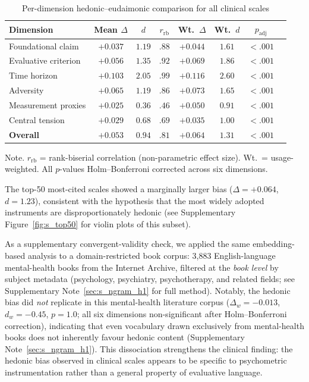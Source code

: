 \documentclass[12pt,a4paper]{article}
\newcommand{\floatnote}[1]{\par\vspace{4pt}\begin{minipage}{\linewidth}\small\textnormal{Note. #1}\end{minipage}}
\begin{document}
\begin{table}[H]
\caption{Per-dimension hedonic--eudaimonic comparison for all clinical scales}
\label{tab:h1_dims}
\small
\begin{tabular}{lccccccc}
\toprule
\textbf{Dimension} & \textbf{Mean $\Delta$} & \textbf{$d$} & \textbf{$r_{\text{rb}}$} & \textbf{Wt.\ $\Delta$} & \textbf{Wt.\ $d$} & \textbf{$p_{\text{adj}}$} \\
\midrule
Foundational claim        & $+0.037$ & $1.19$ & $.88$ & $+0.044$ & $1.61$ & $< .001$ \\
Evaluative criterion      & $+0.056$ & $1.35$ & $.92$ & $+0.069$ & $1.86$ & $< .001$ \\
Time horizon              & $+0.103$ & $2.05$ & $.99$ & $+0.116$ & $2.60$ & $< .001$ \\
Adversity                 & $+0.065$ & $1.19$ & $.86$ & $+0.073$ & $1.65$ & $< .001$ \\
Measurement proxies       & $+0.025$ & $0.36$ & $.46$ & $+0.050$ & $0.91$ & $< .001$ \\
Central tension           & $+0.029$ & $0.68$ & $.69$ & $+0.035$ & $1.00$ & $< .001$ \\
\midrule
\textbf{Overall}       & $\boldsymbol{+0.053}$ & $\boldsymbol{0.94}$ & $\boldsymbol{.81}$ & $\boldsymbol{+0.064}$ & $\boldsymbol{1.31}$ & $\boldsymbol{< .001}$ \\
\bottomrule
\end{tabular}
\floatnote{$r_{\text{rb}}$ = rank-biserial correlation (non-parametric effect size). Wt.\ = usage-weighted. All $p$-values Holm--Bonferroni corrected across six dimensions.}
\end{table}

The top-50 most-cited scales showed a marginally larger bias ($\Delta = +0.064$, $d = 1.23$), consistent with the hypothesis that the most widely adopted instruments are disproportionately hedonic (see Supplementary Figure~\ref{fig:s_top50} for violin plots of this subset).

As a supplementary convergent-validity check, we applied the same embedding-based analysis to a domain-restricted book corpus: 3{,}883 English-language mental-health books from the Internet Archive, filtered at the \textit{book level} by subject metadata (psychology, psychiatry, psychotherapy, and related fields; see Supplementary Note~\ref{sec:s_ngram_h1} for full method).
Notably, the hedonic bias did \textit{not} replicate in this mental-health literature corpus ($\Delta_w = -0.013$, $d_w = -0.45$, $p = 1.0$; all six dimensions non-significant after Holm--Bonferroni correction), indicating that even vocabulary drawn exclusively from mental-health books does not inherently favour hedonic content (Supplementary Note~\ref{sec:s_ngram_h1}).
This dissociation strengthens the clinical finding: the hedonic bias observed in clinical scales appears to be specific to psychometric instrumentation rather than a general property of evaluative language.
\end{document}
